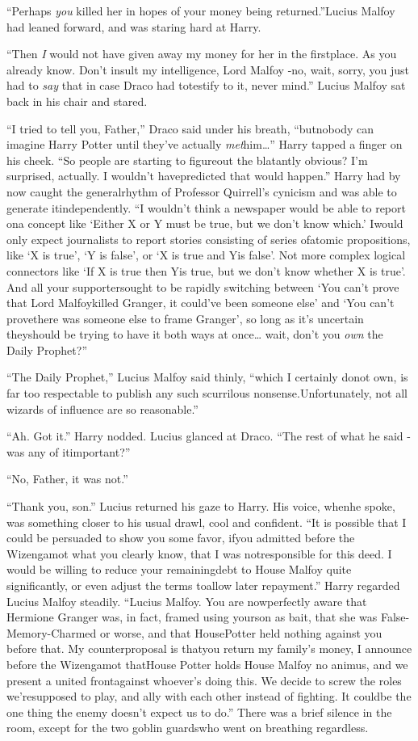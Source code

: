 ``Perhaps \emph{you} killed her in hopes of your money being returned.''Lucius Malfoy had leaned forward, and was staring hard at Harry.

``Then \emph{I} would not have given away my money for her in the firstplace. As you already know. Don't insult my intelligence, Lord Malfoy -no, wait, sorry, you just had to \emph{say} that in case Draco had totestify to it, never mind.''
Lucius Malfoy sat back in his chair and stared.

``I tried to tell you, Father,'' Draco said under his breath, ``butnobody can imagine Harry Potter until they've actually \emph{met}him\ldots{}''
Harry tapped a finger on his cheek. ``So people are starting to figureout the blatantly obvious? I'm surprised, actually. I wouldn't havepredicted that would happen.'' Harry had by now caught the generalrhythm of Professor Quirrell's cynicism and was able to generate itindependently. ``I wouldn't think a newspaper would be able to report ona concept like `Either X or Y must be true, but we don't know which.' Iwould only expect journalists to report stories consisting of series ofatomic propositions, like `X is true', `Y is false', or `X is true and Yis false'. Not more complex logical connectors like `If X is true then Yis true, but we don't know whether X is true'. And all your supportersought to be rapidly switching between `You can't prove that Lord Malfoykilled Granger, it could've been someone else' and `You can't provethere was someone else to frame Granger', so long as it's uncertain theyshould be trying to have it both ways at once\ldots{} wait, don't you
\emph{own} the Daily Prophet?''

``The Daily Prophet,'' Lucius Malfoy said thinly, ``which I certainly donot own, is far too respectable to publish any such scurrilous nonsense.Unfortunately, not all wizards of influence are so reasonable.''

``Ah. Got it.'' Harry nodded.
Lucius glanced at Draco. ``The rest of what he said - was any of itimportant?''

``No, Father, it was not.''

``Thank you, son.'' Lucius returned his gaze to Harry. His voice, whenhe spoke, was something closer to his usual drawl, cool and confident.
``It is possible that I could be persuaded to show you some favor, ifyou admitted before the Wizengamot what you clearly know, that I was notresponsible for this deed. I would be willing to reduce your remainingdebt to House Malfoy quite significantly, or even adjust the terms toallow later repayment.''
Harry regarded Lucius Malfoy steadily. ``Lucius Malfoy. You are nowperfectly aware that Hermione Granger was, in fact, framed using yourson as bait, that she was False-Memory-Charmed or worse, and that HousePotter held nothing against you before that. My counterproposal is thatyou return my family's money, I announce before the Wizengamot thatHouse Potter holds House Malfoy no animus, and we present a united frontagainst whoever's doing this. We decide to screw the roles we'resupposed to play, and ally with each other instead of fighting. It couldbe the one thing the enemy doesn't expect us to do.''
There was a brief silence in the room, except for the two goblin guardswho went on breathing regardless.

